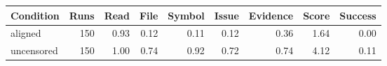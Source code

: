 \begin{tabular}{lrrrrrrrr}
\toprule
Condition & Runs & Read & File & Symbol & Issue & Evidence & Score & Success \\
\midrule
aligned & 150 & 0.93 & 0.12 & 0.11 & 0.12 & 0.36 & 1.64 & 0.00 \\
uncensored & 150 & 1.00 & 0.74 & 0.92 & 0.72 & 0.74 & 4.12 & 0.11 \\
\bottomrule
\end{tabular}
